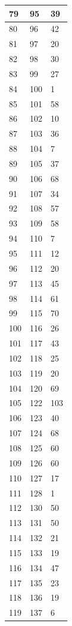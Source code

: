 \begin{tabular}{p{}p{}p{}}
\hline
79 & 95 & 39 \\
\hline
80 & 96 & 42 \\
\hline
81 & 97 & 20 \\
\hline
82 & 98 & 30 \\
\hline
83 & 99 & 27 \\
\hline
84 & 100 & 1 \\
\hline
85 & 101 & 58 \\
\hline
86 & 102 & 10 \\
\hline
87 & 103 & 36 \\
\hline
88 & 104 & 7 \\
\hline
89 & 105 & 37 \\
\hline
90 & 106 & 68 \\
\hline
91 & 107 & 34 \\
\hline
92 & 108 & 57 \\
\hline
93 & 109 & 58 \\
\hline
94 & 110 & 7 \\
\hline
95 & 111 & 12 \\
\hline
96 & 112 & 20 \\
\hline
97 & 113 & 45 \\
\hline
98 & 114 & 61 \\
\hline
99 & 115 & 70 \\
\hline
100 & 116 & 26 \\
\hline
101 & 117 & 43 \\
\hline
102 & 118 & 25 \\
\hline
103 & 119 & 20 \\
\hline
104 & 120 & 69 \\
\hline
105 & 122 & 103 \\
\hline
106 & 123 & 40 \\
\hline
107 & 124 & 68 \\
\hline
108 & 125 & 60 \\
\hline
109 & 126 & 60 \\
\hline
110 & 127 & 17 \\
\hline
111 & 128 & 1 \\
\hline
112 & 130 & 50 \\
\hline
113 & 131 & 50 \\
\hline
114 & 132 & 21 \\
\hline
115 & 133 & 19 \\
\hline
116 & 134 & 47 \\
\hline
117 & 135 & 23 \\
\hline
118 & 136 & 19 \\
\hline
119 & 137 & 6 \\

\end{tabular}

